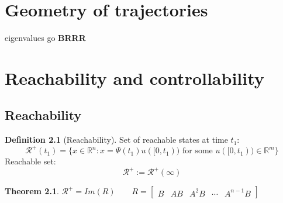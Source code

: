 \documentclass{book}
\newcommand{\R}{\mathbb{R}}
\theoremstyle{definition}
\newtheorem{definition}{Definition}[section]
\newtheorem{theorem}{Theorem}[section]
\theoremstyle{remark}
\theoremstyle{remark}
\begin{document}
\chapter{Geometry of trajectories}
eigenvalues go \textbf{BRRR}














\chapter{Reachability and controllability}
\section{Reachability}
\begin{definition}[Reachability]
    Set of reachable states  at time $t_1$:
    \[
        \mathcal{R}^+(t_1)=\{x\in \R^n : x = \Psi(t_1)u([0,t_1)) \text{ for some }u([0,t_1)) \in \R^m\}
        \]
    Reachable set:
    \[
        \mathcal{R}^+:=\mathcal{R}^+(\infty)
    \]
\end{definition}
\begin{theorem}
    \(\mathcal{R}^+=Im(R) \qquad R=\begin{bmatrix}
        B & AB & A^2B & \cdots & A^{n-1}B
    \end{bmatrix}\)
\end{theorem}
\end{document}
